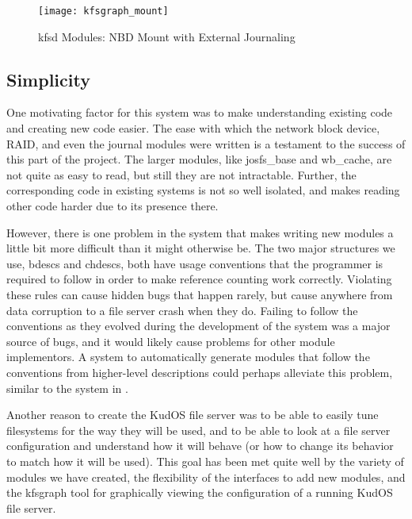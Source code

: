 \begin{figure}[htb]
\begin{center}
  \texttt{[image: kfsgraph\_mount]}
  \caption{kfsd Modules: NBD Mount with External Journaling}
  \label{fig:kfsgraph-mount}
\end{center}
\end{figure}

\subsection{Simplicity}
\label{sec:eval:simplicity}

One motivating factor for this system was to make understanding existing code
and creating new code easier. The ease with which the network block device,
RAID, and even the journal modules were written is a testament to the success of
this part of the project. The larger modules, like josfs\_base and wb\_cache,
are not quite as easy to read, but still they are not intractable. Further, the
corresponding code in existing systems is not so well isolated, and makes
reading other code harder due to its presence there.

However, there is one problem in the system that makes writing new modules a
little bit more difficult than it might otherwise be. The two major structures
we use, bdescs and chdescs, both have usage conventions that the programmer is
required to follow in order to make reference counting work correctly. Violating
these rules can cause hidden bugs that happen rarely, but cause anywhere from
data corruption to a file server crash when they do. Failing to follow the
conventions as they evolved during the development of the system was a major
source of bugs, and it would likely cause problems for other module
implementors. A system to automatically generate modules that follow the
conventions from higher-level descriptions could perhaps alleviate this problem,
similar to the system in \cite{zadok00fist}.

Another reason to create the KudOS file server was to be able to easily tune
filesystems for the way they will be used, and to be able to look at a file
server configuration and understand how it will behave (or how to change its
behavior to match how it will be used). This goal has been met quite well by the
variety of modules we have created, the flexibility of the interfaces to add new
modules, and the kfsgraph tool for graphically viewing the configuration of a
running KudOS file server.

